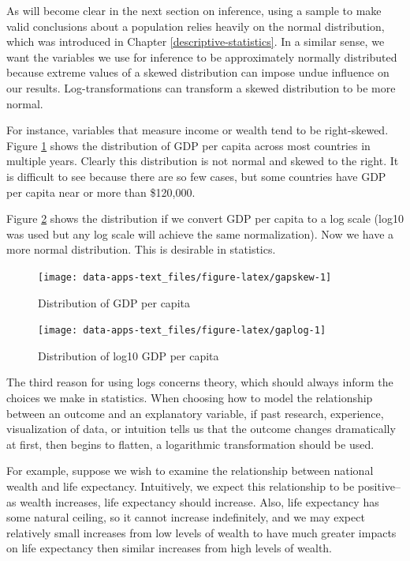 \documentclass[
]{book}
\begin{document}
As will become clear in the next section on inference, using a sample to make valid conclusions about a population relies heavily on the normal distribution, which was introduced in Chapter \ref{descriptive-statistics}. In a similar sense, we want the variables we use for inference to be approximately normally distributed because extreme values of a skewed distribution can impose undue influence on our results. Log-transformations can transform a skewed distribution to be more normal.

For instance, variables that measure income or wealth tend to be right-skewed. Figure \ref{fig:gapskew} shows the distribution of GDP per capita across most countries in multiple years. Clearly this distribution is not normal and skewed to the right. It is difficult to see because there are so few cases, but some countries have GDP per capita near or more than \$120,000.

Figure \ref{fig:gaplog} shows the distribution if we convert GDP per capita to a log scale (log10 was used but any log scale will achieve the same normalization). Now we have a more normal distribution. This is desirable in statistics.

\begin{figure}

{\centering \texttt{[image: data-apps-text\_files/figure-latex/gapskew-1]} 

}

\caption{Distribution of GDP per capita}\label{fig:gapskew}
\end{figure}

\begin{figure}

{\centering \texttt{[image: data-apps-text\_files/figure-latex/gaplog-1]} 

}

\caption{Distribution of log10 GDP per capita}\label{fig:gaplog}
\end{figure}

The third reason for using logs concerns theory, which should always inform the choices we make in statistics. When choosing how to model the relationship between an outcome and an explanatory variable, if past research, experience, visualization of data, or intuition tells us that the outcome changes dramatically at first, then begins to flatten, a logarithmic transformation should be used.

For example, suppose we wish to examine the relationship between national wealth and life expectancy. Intuitively, we expect this relationship to be positive--as wealth increases, life expectancy should increase. Also, life expectancy has some natural ceiling, so it cannot increase indefinitely, and we may expect relatively small increases from low levels of wealth to have much greater impacts on life expectancy then similar increases from high levels of wealth.
\end{document}
